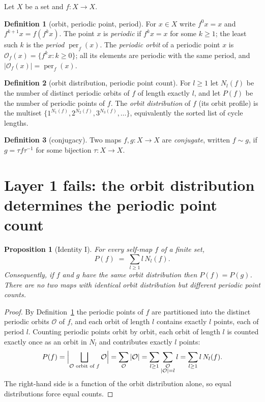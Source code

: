 \documentclass[11pt]{article}
\newtheorem{proposition}{Proposition}
\theoremstyle{definition}
\newtheorem{definition}{Definition}
\newcommand{\conj}{\mathrel{\sim}}
\begin{document}
Let $X$ be a set and $f\colon X\to X$.

\begin{definition}[orbit, periodic point, period]\label{def:period}
For $x\in X$ write $f^0x=x$ and $f^{k+1}x=f(f^kx)$. The point $x$ is
\emph{periodic} if $f^kx=x$ for some $k\ge 1$; the least such $k$ is the
\emph{period} $\operatorname{per}_f(x)$. The \emph{periodic orbit} of a periodic
point $x$ is $\mathcal{O}_f(x)=\{f^kx : k\ge 0\}$; all its elements are periodic
with the same period, and $|\mathcal{O}_f(x)|=\operatorname{per}_f(x)$.
\end{definition}

\begin{definition}[orbit distribution, periodic point count]\label{def:profile}
For $l\ge 1$ let $N_l(f)$ be the number of distinct periodic orbits of $f$ of
length exactly $l$, and let $P(f)$ be the number of periodic points of $f$. The
\emph{orbit distribution} of $f$ (its orbit profile) is the multiset
$\{1^{N_1(f)},2^{N_2(f)},3^{N_3(f)},\dots\}$, equivalently the sorted list of
cycle lengths.
\end{definition}

\begin{definition}[conjugacy]\label{def:conj}
Two maps $f,g\colon X\to X$ are \emph{conjugate}, written $f\conj g$, if
$g=\tau f\tau^{-1}$ for some bijection $\tau\colon X\to X$.
\end{definition}

\section{Layer 1 fails: the orbit distribution determines the periodic point count}

\begin{proposition}[Identity I]\label{prop:I}
For every self-map $f$ of a finite set,
\begin{equation}
P(f)\;=\;\sum_{l\ge 1} l\,N_l(f).
\end{equation}
Consequently, if $f$ and $g$ have the same orbit distribution then
$P(f)=P(g)$. There are no two maps with identical orbit distribution but
different periodic point counts.
\end{proposition}

\begin{proof}
By Definition~\ref{def:period} the periodic points of $f$ are partitioned into
the distinct periodic orbits $\mathcal{O}$ of $f$, and each orbit of length $l$
contains exactly $l$ points, each of period $l$. Counting periodic points orbit
by orbit, each orbit of length $l$ is counted exactly once as an orbit in $N_l$
and contributes exactly $l$ points:
\[
P(f)=\Bigl|\bigsqcup_{\mathcal{O}\text{ orbit of }f}\mathcal{O}\Bigr|
=\sum_{\mathcal{O}}|\mathcal{O}|=\sum_{l\ge1}\sum_{\substack{\mathcal{O}\\
|\mathcal{O}|=l}}l=\sum_{l\ge1}l\,N_l(f).
\]
The right-hand side is a function of the orbit distribution alone, so equal
distributions force equal counts.
\end{proof}
\end{document}
